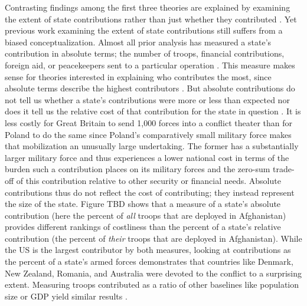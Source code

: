 \documentclass[12pt,letterpaper]{article}
\begin{document}
		Contrasting findings among the first three theories are explained by examining the extent of state contributions rather than just whether they contributed \citep[4]{cranmer_coalitionqualitymultinational_2017}. Yet previous work examining the extent of state contributions still suffers from a biased conceptualization. Almost all prior analysis has measured a state's contribution in absolute terms; the number of troops, financial contributions, foreign aid, or peacekeepers sent to a particular operation \citep{mello_democraticparticipationarmed_2014, haesebrouck_explainingmemberstates_2016}. This measure makes sense for theories interested in explaining who contributes the most, since absolute terms describe the highest contributors \citep[40-41]{bogers_missionafghanistanwho_2013}. But absolute contributions do not tell us whether a state's contributions were more or less than expected nor does it tell us the relative cost of that contribution for the state in question \citep{kreps_eliteconsensusdeterminant_2010}. It is less costly for Great Britain to send 1,000 forces into a conflict theater than for Poland to do the same since Poland's comparatively small military force makes that mobilization an unusually large undertaking. The former has a substantially larger military force and thus experiences a lower national cost in terms of the burden such a contribution places on its military forces and the zero-sum trade-off of this contribution relative to other security or financial needs. Absolute contributions thus do not reflect the cost of contributing; they instead represent the size of the state. Figure TBD shows that a measure of a state's absolute contribution (here the percent of \emph{all} troops that are deployed in Afghanistan) provides different rankings of costliness than the percent of a state's relative contribution (the percent of \textit{their} troops that are deployed in Afghanistan). While the US is the largest contributor by both measures, looking at contributions as the percent of a state's armed forces demonstrates that countries like Denmark, New Zealand, Romania, and Australia were devoted to the conflict to a surprising extent. Measuring troops contributed as a ratio of other baselines like population size or GDP yield similar results \citep[41]{bogers_missionafghanistanwho_2013}.

\end{document}
